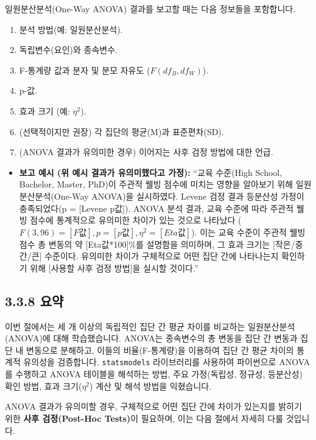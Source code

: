\documentclass[
  letterpaper,
]{book}
\providecommand{\tightlist}{%
  \setlength{\itemsep}{0pt}\setlength{\parskip}{0pt}}
\begin{document}
일원분산분석(One-Way ANOVA) 결과를 보고할 때는 다음 정보들을 포함합니다.

\begin{enumerate}
\def\labelenumi{\arabic{enumi}.}
\tightlist
\item
  분석 방법(예: 일원분산분석).
\item
  독립변수(요인)와 종속변수.
\item
  F-통계량 값과 분자 및 분모 자유도 (\(F(df_B, df_W)\)).
\item
  p-값.
\item
  효과 크기 (예: \(\eta^2\)).
\item
  (선택적이지만 권장) 각 집단의 평균(M)과 표준편차(SD).
\item
  (ANOVA 결과가 유의미한 경우) 이어지는 사후 검정 방법에 대한 언급.
\end{enumerate}

\begin{itemize}
\tightlist
\item
  \textbf{보고 예시 (위 예시 결과가 유의미했다고 가정):} ``교육
  수준(High School, Bachelor, Master, PhD)이 주관적 웰빙 점수에 미치는
  영향을 알아보기 위해 일원분산분석(One-Way ANOVA)을 실시하였다. Levene
  검정 결과 등분산성 가정이 충족되었다(p = {[}Levene p값{]}). ANOVA 분석
  결과, 교육 수준에 따라 주관적 웰빙 점수에 통계적으로 유의미한 차이가
  있는 것으로 나타났다
  (\(F(3, 96) = [F값], p = [p값], \eta^2 = [Eta값]\)). 이는 교육 수준이
  주관적 웰빙 점수 총 변동의 약 {[}Eta값*100{]}\%를 설명함을 의미하며,
  그 효과 크기는 {[}작은/중간/큰{]} 수준이다. 유의미한 차이가 구체적으로
  어떤 집단 간에 나타나는지 확인하기 위해 {[}사용할 사후 검정 방법{]}을
  실시할 것이다.''
\end{itemize}

\subsection{3.3.8 요약}\label{uxc694uxc57d}

이번 절에서는 세 개 이상의 독립적인 집단 간 평균 차이를 비교하는
일원분산분석(ANOVA)에 대해 학습했습니다. ANOVA는 종속변수의 총 변동을
집단 간 변동과 집단 내 변동으로 분해하고, 이들의 비율(F-통계량)을
이용하여 집단 간 평균 차이의 통계적 유의성을 검증합니다.
\texttt{statsmodels} 라이브러리를 사용하여 파이썬으로 ANOVA를 수행하고
ANOVA 테이블을 해석하는 방법, 주요 가정(독립성, 정규성, 등분산성) 확인
방법, 효과 크기(\(\eta^2\)) 계산 및 해석 방법을 익혔습니다.

ANOVA 결과가 유의미할 경우, 구체적으로 어떤 집단 간에 차이가 있는지를
밝히기 위한 \textbf{사후 검정(Post-Hoc Tests)}이 필요하며, 이는 다음
절에서 자세히 다룰 것입니다.
\end{document}
